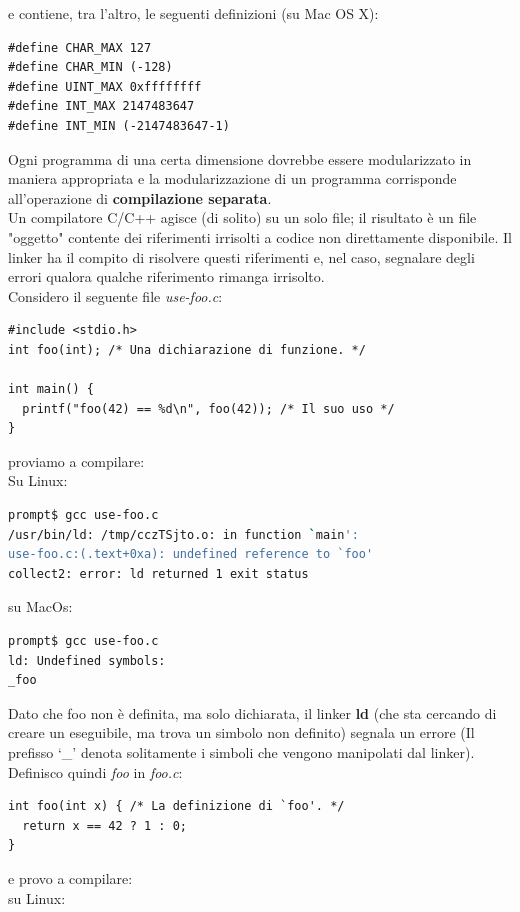 \documentclass[a4paper,12pt, oneside]{book}
\begin{document}
e contiene, tra l'altro, le seguenti definizioni (su Mac OS X):
\begin{verbatim}
#define CHAR_MAX 127
#define CHAR_MIN (-128)
#define UINT_MAX 0xffffffff
#define INT_MAX 2147483647
#define INT_MIN (-2147483647-1)
\end{verbatim}
Ogni programma di una certa dimensione dovrebbe essere
modularizzato in maniera appropriata e la modularizzazione di un programma corrisponde
all'operazione di \textbf{compilazione separata}.\\
Un compilatore C/C++ agisce (di solito) su un solo file; il
risultato è un file "oggetto" contente dei riferimenti irrisolti a codice non direttamente disponibile. Il linker ha il compito di risolvere questi riferimenti e, nel caso,
segnalare degli errori qualora qualche riferimento rimanga
irrisolto.\\
Considero il seguente file \textit{use-foo.c}:
\begin{verbatim}
#include <stdio.h>
int foo(int); /* Una dichiarazione di funzione. */

int main() {
  printf("foo(42) == %d\n", foo(42)); /* Il suo uso */
}
\end{verbatim}
proviamo a compilare:\\
Su Linux:
\begin{shaded}
\begin{lstlisting}[language=bash]
prompt$ gcc use-foo.c 
/usr/bin/ld: /tmp/cczTSjto.o: in function `main':
use-foo.c:(.text+0xa): undefined reference to `foo'
collect2: error: ld returned 1 exit status
\end{lstlisting}
\end{shaded}
su MacOs:
\begin{shaded}
\begin{lstlisting}[language=bash]
prompt$ gcc use-foo.c
ld: Undefined symbols:
_foo
\end{lstlisting}
\end{shaded}
Dato che foo non è definita, ma solo dichiarata, il linker \textbf{ld} (che sta cercando di
creare un eseguibile, ma trova un simbolo non definito) segnala un errore (Il prefisso ‘\_' denota solitamente i simboli che vengono manipolati dal linker).\\
Definisco quindi \textit{foo} in \textit{foo.c}:
\begin{verbatim}
int foo(int x) { /* La definizione di `foo'. */
  return x == 42 ? 1 : 0;
}
\end{verbatim}
e provo a compilare:\\
su Linux:
\end{document}

